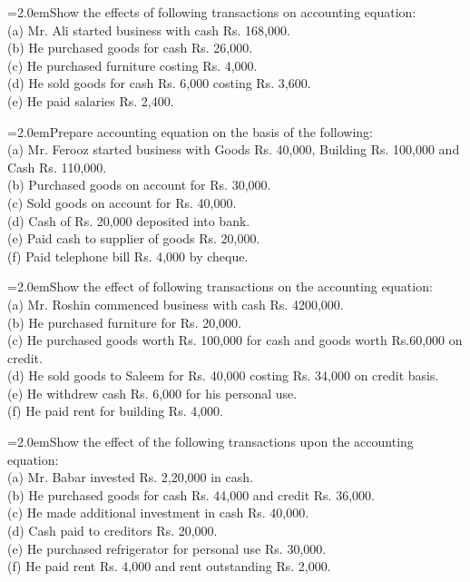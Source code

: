 \documentclass[11pt,a4paper]{article}
\newcommand{\lqn}[2]{\Needspace{6\baselineskip}\par\medskip\noindent\hangindent=2.0em\hangafter=1\makebox[2.0em][l]{\textbf{#1.}}#2\par}
\begin{document}
\lqn{1}{Show the effects of following transactions on accounting equation:\\
(a) Mr. Ali started business with cash Rs. 168,000.\\
(b) He purchased goods for cash Rs. 26,000.\\
(c) He purchased furniture costing Rs. 4,000.\\
(d) He sold goods for cash Rs. 6,000 costing Rs. 3,600.\\
(e) He paid salaries Rs. 2,400.\par
}
\lqn{2}{Prepare accounting equation on the basis of the following:\\
(a) Mr. Ferooz started business with Goods Rs. 40,000, Building Rs. 100,000 and Cash Rs. 110,000.\\
(b) Purchased goods on account for Rs. 30,000.\\
(c) Sold goods on account for Rs. 40,000.\\
(d) Cash of Rs. 20,000 deposited into bank.\\
(e) Paid cash to supplier of goods Rs. 20,000.\\
(f) Paid telephone bill Rs. 4,000 by cheque.\par
}
\lqn{3}{Show the effect of following transactions on the accounting equation:\\
(a) Mr. Roshin commenced business with cash Rs. 4200,000.\\
(b) He purchased furniture for Rs. 20,000.\\
(c) He purchased goods worth Rs. 100,000 for cash and goods worth Rs.60,000 on credit.\\
(d) He sold goods to Saleem for Rs. 40,000 costing Rs. 34,000 on credit basis.\\
(e) He withdrew cash Rs. 6,000 for his personal use.\\
(f) He paid rent for building Rs. 4,000.\par
}
\lqn{4}{Show the effect of the following transactions upon the accounting equation:\\
(a) Mr. Babar invested Rs. 2,20,000 in cash.\\
(b) He purchased goods for cash Rs. 44,000 and credit Rs. 36,000.\\
(c) He made additional investment in cash Rs. 40,000.\\
(d) Cash paid to creditors Rs. 20,000.\\
(e) He purchased refrigerator for personal use Rs. 30,000.\\
(f) He paid rent Rs. 4,000 and rent outstanding Rs. 2,000.\par
}
\end{document}
